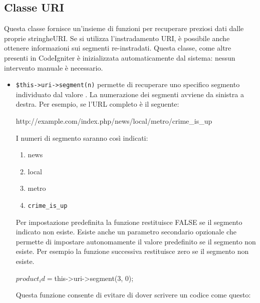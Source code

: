 \subsection{Classe URI}
\label{class:uriclasse}

Questa classe fornisce un'insieme di funzioni per recuperare preziosi dati dalle proprie stringhe\ac{URI}. Se si utilizza l'instradamento \ac{URI}, è possibile anche ottenere informazioni sui segmenti re-instradati. Questa classe, come altre presenti in CodeIgniter è inizializzata automaticamente dal sistema: nessun intervento manuale è necessario.

\begin{itemize}
\item \verb|$this->uri->segment(n)| permette di recuperare uno specifico segmento individuato dal valore . La numerazione dei segmenti avviene da sinistra a destra. Per esempio, se l'\ac{URL} completo è il seguente:

\begin{code}
http://example.com/index.php/news/local/metro/crime_is_up
\end{code}

I numeri di segmento saranno così indicati:

\begin{enumerate}
\item news
\item local
\item metro
\item \verb|crime_is_up|
\end{enumerate}

Per impostazione predefinita la funzione restituisce FALSE se il segmento indicato non esiste. Esiste anche un parametro secondario opzionale che permette di impostare autonomamente il valore predefinito se il segmento non esiste. Per esempio la funzione successiva restituisce zero se il segmento non esiste.

\begin{code}
$product_id = $this->uri->segment(3, 0);
\end{code}

Questa funzione consente di evitare di dover scrivere un codice come questo:



\end{itemize}

